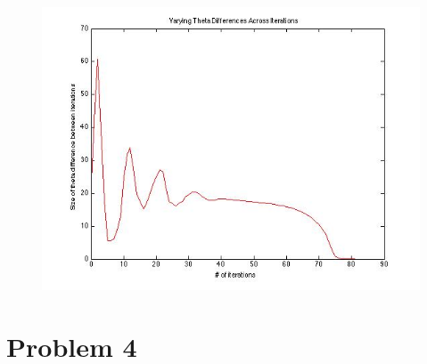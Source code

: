 \documentclass[paper=a4, fontsize=11pt]{scrartcl} %
\numberwithin{equation}{section} %
\numberwithin{figure}{section} %
\numberwithin{table}{section} %
\begin{document}
\begin{figure}
\centering
\includegraphics[scale=0.4]{theta_diff.jpg}
\end{figure}


\section{Problem 4}
\end{document}
